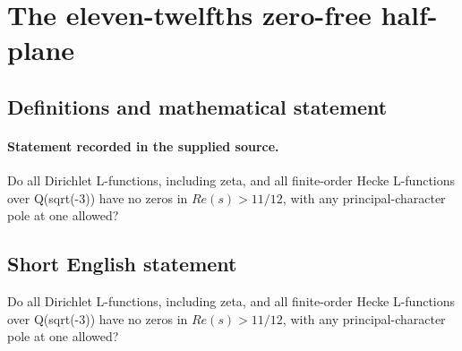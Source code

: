 \documentclass[11pt]{article}
\begin{document}
\section*{The eleven-twelfths zero-free half-plane}\label{30007278}
\subsection{Definitions and mathematical statement}
\paragraph{Statement recorded in the supplied source.}
Do all Dirichlet L-functions, including zeta, and all finite-order Hecke L-functions over Q(sqrt(-3)) have no zeros in $Re(s)>11/12$, with any principal-character pole at one allowed?
\subsection{Short English statement}
Do all Dirichlet L-functions, including zeta, and all finite-order Hecke L-functions over Q(sqrt(-3)) have no zeros in $Re(s)>11/12$, with any principal-character pole at one allowed?
\end{document}
